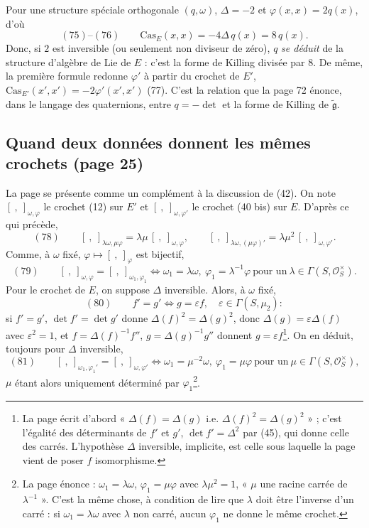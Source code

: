 \documentclass[11pt,a4paper]{article}
\begin{document}
Pour une structure spéciale orthogonale $(q, \omega)$, $\Delta = -2$ et
$\varphi(x, x) = 2q(x)$, d'où
\[
  (75)\text{--}(76) \qquad \mathrm{Cas}_E(x, x) = -4\Delta\, q(x) = 8\, q(x) .
\]
Donc, si $2$ est inversible (ou seulement non diviseur de zéro), $q$ \emph{se
déduit} de la structure d'algèbre de Lie de $E$ : c'est la forme de Killing
divisée par $8$. De même, la première formule redonne $\varphi'$ à partir du
crochet de $E'$, $\mathrm{Cas}_{E'}(x', x') = -2\varphi'(x', x')$ (77). C'est la
relation que la page 72 énonce, dans le langage des quaternions, entre $q = -\det$
et la forme de Killing de $\widetilde{\mathfrak{g}}$.

\subsection*{Quand deux données donnent les mêmes crochets (page 25)}

La page se présente comme un complément à la discussion de (42). On note
$[\ ,\ ]_{\omega, \varphi}$ le crochet (12) sur $E'$ et $[\ ,\ ]_{\omega, \varphi'}$ le
crochet (40 bis) sur $E$. D'après ce qui précède,
\[
  (78) \qquad [\ ,\ ]_{\lambda\omega, \mu\varphi} = \lambda\mu\, [\ ,\ ]_{\omega, \varphi} ,
  \qquad [\ ,\ ]_{\lambda\omega, (\mu\varphi)'} = \lambda\mu^2\, [\ ,\ ]_{\omega, \varphi'} .
\]
Comme, à $\omega$ fixé, $\varphi \mapsto [\ ,\ ]_{\varphi}$ est bijectif,
\[
  (79) \qquad [\ ,\ ]_{\omega, \varphi} = [\ ,\ ]_{\omega_1, \varphi_1}
  \iff \omega_1 = \lambda\omega ,\ \varphi_1 = \lambda^{-1}\varphi \ \text{pour un}\ \lambda \in \Gamma(S, \mathcal{O}_S^{\times}).
\]
Pour le crochet de $E$, on suppose $\Delta$ inversible. Alors, à $\omega$ fixé,
\[
  (80) \qquad f' = g' \iff g = \varepsilon f , \quad \varepsilon \in \Gamma(S, \mu_2) :
\]
si $f' = g'$, $\det f' = \det g'$ donne $\Delta(f)^2 = \Delta(g)^2$, donc
$\Delta(g) = \varepsilon\Delta(f)$ avec $\varepsilon^2 = 1$, et $f = \Delta(f)^{-1}f''$,
$g = \Delta(g)^{-1}g''$ donnent $g = \varepsilon f$\footnote{La page écrit d'abord
« $\Delta(f) = \Delta(g)$ i.e. $\Delta(f)^2 = \Delta(g)^2$ » ; c'est l'égalité des
déterminants de $f'$ et $g'$, $\det f' = \Delta^2$ par (45), qui donne celle des
carrés. L'hypothèse $\Delta$ inversible, implicite, est celle sous laquelle la
page vient de poser $f$ isomorphisme.}. On en déduit, toujours pour $\Delta$
inversible,
\[
  (81) \qquad [\ ,\ ]_{\omega_1, \varphi_1'} = [\ ,\ ]_{\omega, \varphi'}
  \iff \omega_1 = \mu^{-2}\omega ,\ \varphi_1 = \mu\varphi \ \text{pour un}\ \mu \in \Gamma(S, \mathcal{O}_S^{\times}),
\]
$\mu$ étant alors uniquement déterminé par $\varphi_1$\footnote{La page énonce :
$\omega_1 = \lambda\omega$, $\varphi_1 = \mu\varphi$ avec $\lambda\mu^2 = 1$, « $\mu$ une
racine carrée de $\lambda^{-1}$ ». C'est la même chose, à condition de lire que
$\lambda$ doit être l'inverse d'un carré : si $\omega_1 = \lambda\omega$ avec $\lambda$
non carré, aucun $\varphi_1$ ne donne le même crochet.}.
\end{document}

